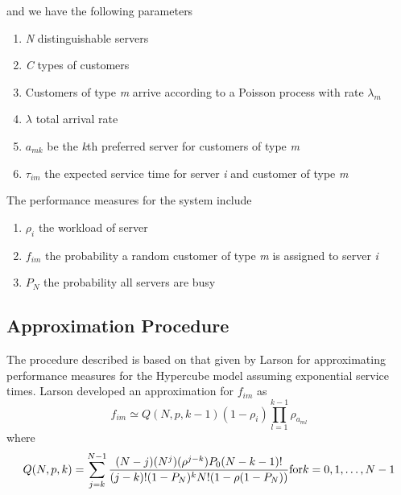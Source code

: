 \begin{frame}
  and we have the following parameters
  \begin{enumerate}
  \item \textit{N} distinguishable servers
  \item \textit{C} types of customers
  \item Customers of type \textit{m} arrive according to a Poisson process with rate $\lambda_{m}$
  \item $\lambda$ total arrival rate
  \item $a_{mk}$ be the \textit{k}th preferred server for customers of type \textit{m}
  \item $\tau_{im}$ the expected service time for server \textit{i} and customer of type \textit{m}
  \end{enumerate}
\end{frame}

\begin{frame}
  The performance measures for the system include 
  \begin{enumerate}
  \item $\rho_i$ the workload of server 
  \item $f_{im}$ the probability a random customer of type \textit{m} is assigned to server \textit{i}
  \item $P_{N}$ the probability all servers are busy
  \end{enumerate}
\end{frame}

\subsection{Approximation Procedure}
\begin{frame}
  The procedure described is based on that given by Larson \cite{larson1975approximating}
  for approximating performance measures for the Hypercube model assuming exponential service times.
  Larson developed an approximation for $f_{im}$ as
  \begin{equation} \label{f_im}
    f_{im} \simeq Q(N,p,k-1)(1-\rho_{i})\prod_{l=1}^{k-1}{\rho_{a_{ml}}}
  \end{equation}
  where
  \begin{equation} \label{Q}
    Q(N,p,k)=\sum_{j=k}^{N-1}{\frac{(N-j)(N^j)(\rho^{j-k})P_0(N-k-1)!}{(j-k)!(1-P_N)^kN!(1-\rho(1-P_N))}} \\
    \hfill \mbox{for} k = 0,1,\ldots,N-1
  \end{equation}
\end{frame}

